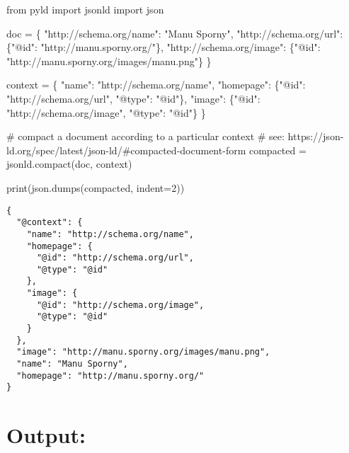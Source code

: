\documentclass[
  letterpaper,
  DIV=11,
  numbers=noendperiod]{scrartcl}
\newenvironment{Shaded}{\begin{snugshade}}{\end{snugshade}}
\newcommand{\BuiltInTok}[1]{\textcolor[rgb]{0.00,0.23,0.31}{#1}}
\newcommand{\CommentTok}[1]{\textcolor[rgb]{0.37,0.37,0.37}{#1}}
\newcommand{\DecValTok}[1]{\textcolor[rgb]{0.68,0.00,0.00}{#1}}
\newcommand{\ImportTok}[1]{\textcolor[rgb]{0.00,0.46,0.62}{#1}}
\newcommand{\NormalTok}[1]{\textcolor[rgb]{0.00,0.23,0.31}{#1}}
\newcommand{\OperatorTok}[1]{\textcolor[rgb]{0.37,0.37,0.37}{#1}}
\newcommand{\StringTok}[1]{\textcolor[rgb]{0.13,0.47,0.30}{#1}}
\begin{document}
\begin{Shaded}
\begin{Highlighting}[]
\ImportTok{from}\NormalTok{ pyld }\ImportTok{import}\NormalTok{ jsonld}
\ImportTok{import}\NormalTok{ json}

\NormalTok{doc }\OperatorTok{=}\NormalTok{ \{}
    \StringTok{"http://schema.org/name"}\NormalTok{: }\StringTok{"Manu Sporny"}\NormalTok{,}
    \StringTok{"http://schema.org/url"}\NormalTok{: \{}\StringTok{"@id"}\NormalTok{: }\StringTok{"http://manu.sporny.org/"}\NormalTok{\},}
    \StringTok{"http://schema.org/image"}\NormalTok{: \{}\StringTok{"@id"}\NormalTok{: }\StringTok{"http://manu.sporny.org/images/manu.png"}\NormalTok{\}}
\NormalTok{\}}

\NormalTok{context }\OperatorTok{=}\NormalTok{ \{}
    \StringTok{"name"}\NormalTok{: }\StringTok{"http://schema.org/name"}\NormalTok{,}
    \StringTok{"homepage"}\NormalTok{: \{}\StringTok{"@id"}\NormalTok{: }\StringTok{"http://schema.org/url"}\NormalTok{, }\StringTok{"@type"}\NormalTok{: }\StringTok{"@id"}\NormalTok{\},}
    \StringTok{"image"}\NormalTok{: \{}\StringTok{"@id"}\NormalTok{: }\StringTok{"http://schema.org/image"}\NormalTok{, }\StringTok{"@type"}\NormalTok{: }\StringTok{"@id"}\NormalTok{\}}
\NormalTok{\}}

\CommentTok{\# compact a document according to a particular context}
\CommentTok{\# see: https://json{-}ld.org/spec/latest/json{-}ld/\#compacted{-}document{-}form}
\NormalTok{compacted }\OperatorTok{=}\NormalTok{ jsonld.compact(doc, context)}

\BuiltInTok{print}\NormalTok{(json.dumps(compacted, indent}\OperatorTok{=}\DecValTok{2}\NormalTok{))}
\end{Highlighting}
\end{Shaded}

\begin{verbatim}
{
  "@context": {
    "name": "http://schema.org/name",
    "homepage": {
      "@id": "http://schema.org/url",
      "@type": "@id"
    },
    "image": {
      "@id": "http://schema.org/image",
      "@type": "@id"
    }
  },
  "image": "http://manu.sporny.org/images/manu.png",
  "name": "Manu Sporny",
  "homepage": "http://manu.sporny.org/"
}
\end{verbatim}

\hypertarget{output}{%
\section{Output:}\label{output}}
\end{document}
